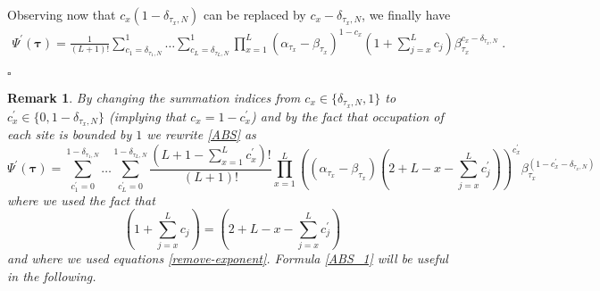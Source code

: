 \documentclass[10pt]{article}
\numberwithin{equation}{section}
\numberwithin{equation}{subsection}
\newtheorem{remark}{Remark}
\newcommand{\dt}{\;.}
\newcommand{\fra}[1]{\textcolor[rgb]{0,0,1}{#1}}
\begin{document}
Observing now that $c_{x}(1-\delta_{\tau_{x},N})$ can be replaced by  $c_{x}-\delta_{\tau_{x},N}$, we finally have
\begin{equation}\label{elementsABS}
	\begin{split}
		\Psi^{'}(\bm{\tau})=\frac{1}{(L+1)!}\sum_{c_{1}=\delta_{\tau_{1},N}}^{1}\ldots\sum_{c_{L}=\delta_{\tau_{L},N}}^{1}\prod_{x=1}^{L}(\alpha_{\tau_{x}}-\beta_{\tau_{x}})^{1-c_{x}}\left(1+\sum_{j=x}^{L}c_{j}\right)\beta_{\tau_{x}}^{c_{x}-\delta_{\tau_{x},N}}\dt
	\end{split}
\end{equation} 
\begin{flushright}
    $\square$
\end{flushright}
\begin{remark} By changing the summation indices from $c_x\in \{\delta_{\tau_{x},N},1\}$ to $c_{x}^{'}\in \{0,1-\delta_{\tau_{x},N}\}$ \fra{(implying that $c_{x}=1-c_{x}^{'}$)} and by  the fact that occupation of each site is bounded by $1$ we rewrite \eqref{ABS} as 
\begin{equation}\label{ABS_1}
	\Psi^{'}(\bm{\tau})=\sum_{c^{'}_{1}=0}^{1-\delta_{\tau_{1},N}}\ldots\sum_{c^{'}_{L}=0}^{1-\delta_{\tau_{L},N}}\frac{(L+1-\sum_{x=1}^{L}c^{'}_{x})!}{(L+1)!}\prod_{x=1}^{L}\left((\alpha_{\tau_{x}}-\beta_{\tau_{x}})\left(2+L-x-\sum_{j=x}^{L}c^{'}_{j}\right)\right)^{c^{'}_{x}}\beta_{\tau_{x}}^{(1-c^{'}_{x}-\delta_{\tau_{x},N})}
\end{equation}
where we used the fact that 
\begin{equation}
	\left(1+\sum_{j=x}^{L}c_{j}\right) =\left(2+L-x-\sum_{j=x}^{L}c^{'}_{j}\right)
\end{equation}
\fra{and where we used equations \eqref{remove-exponent}.}
Formula \eqref{ABS_1} will be useful in the following. 
\end{remark}
\end{document}
